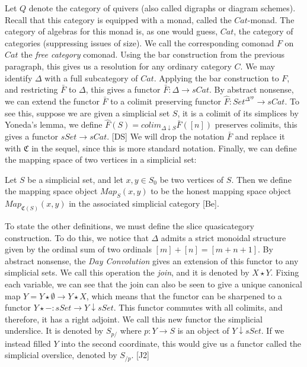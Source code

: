 \documentclass{amsart}
\begin{document}
Let $Q$ denote the category of quivers (also called digraphs or diagram schemes).  Recall that this category is equipped with a monad, called the  $Cat$-monad.  The category of algebras for this monad is, as one would guess, $Cat$, the category of categories (suppressing issues of size).  We call the corresponding comonad $F$ on $Cat$ the \emph{free category} comonad.  Using the bar construction from the previous paragraph, this gives us a resolution for any ordinary category $C$.  We may identify $\Delta$ with a full subcategory of $Cat$.  Applying the bar construction to $F$, and restricting $\bar{F}$ to  $\Delta$, this gives a functor $\bar{F}:\Delta\to sCat$.  By abstract nonsense, we can extend the functor $\bar{F}$ to a colimit preserving functor $\hat{F}:Set^{\Delta^{op}}\to sCat$.  To see this, suppose we are given a simplicial set $S$, it is a colimit of its simplices by Yoneda's lemma, we define $\hat{F}(S)=colim_{\Delta\downarrow S}\bar{F}([n])$ preserves colimits, this gives a functor $sSet\to sCat$. [DS] We will drop the notation $\bar{F}$ and replace it with $\mathfrak{C}$ in the sequel, since this is more standard notation. Finally, we can define the mapping space of two vertices in a simplicial set:

\begin{defn}
Let $S$ be a simplicial set, and let $x,y\in S_0$ be two vertices of $S$.  Then we define the mapping space object $Map_S(x,y)$ to be the honest mapping space object $Map_{\mathfrak{C}(S)}(x,y)$ in the associated simplicial category [Be].  
\end{defn}

To state the other definitions, we must define the slice quasicategory construction.  To do this, we notice that $\Delta$ admits a strict monoidal structure given by the ordinal sum of two ordinals $[m]+[n]=[m+n+1]$.  By abstract nonsense, the \emph{Day Convolution} gives an extension of this functor to any simplicial sets.  We call this operation the \emph{join}, and it is denoted by $X\star Y$.  Fixing each variable, we can see that the join can also be seen to give a unique canonical map $Y=Y\star\emptyset \to Y\star X$, which means that the functor can be sharpened to a functor $Y\star -:sSet\to Y\downarrow sSet$.  This functor commutes with all colimits, and therefore, it has a right adjoint.  We call this new functor the simplicial underslice.  It is denoted by $S_{p/}$ where $p:Y\to S$ is an object of $Y\downarrow sSet$. If we instead filled $Y$ into the second coordinate, this would give us a functor called the simplicial overslice, denoted by $S_{/p}$.  [J2] 
\end{document}
